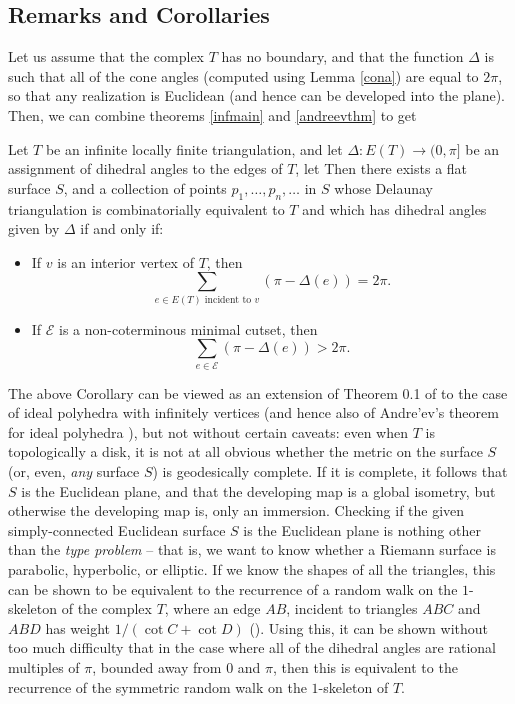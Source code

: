 \documentclass{acmart}
\newcommand{\thm}[2]{\begin{#1} #2 \end{#1}}
\begin{document}
\subsection{Remarks and Corollaries}

Let us assume that the complex $T$ has no boundary, and that the
function $\Delta$ is such that all of the cone angles (computed using
Lemma \ref{cona}) are equal to $2\pi$, so that any realization is
Euclidean (and hence can be developed into the plane). Then, we can
combine theorems \ref{infmain} and \ref{andreevthm} to get 

\thm{corollary}
{
\label{infandreev}
Let $T$ be an infinite locally finite triangulation, and let $\Delta:
E(T) \rightarrow (0, \pi]$ be an assignment of dihedral angles to the
edges of $T$, let Then there exists a flat surface $S$, and a
collection of points $p_1, \ldots, p_n, \ldots$ in $S$ whose Delaunay
triangulation is combinatorially equivalent to $T$ and which has dihedral
angles given by $\Delta$ if and only if:

\begin{itemize}

\item\label{sumvv1} If $v$ is an interior vertex of $T$, then
\begin{equation}
\sum_{\mbox{$e \in E(T)$ incident to $v$}} (\pi - \Delta(e)) = 2\pi.
\end{equation}

\item\label{sumintcyc1} If $\mathcal{E}$ is a non-coterminous minimal
  cutset, then
\begin{equation}
\sum_{e \in \mathcal{E}} (\pi - \Delta(e)) > 2\pi.
\end{equation}

\end{itemize}
}

The above Corollary can be viewed as an extension of Theorem 0.1 of
\cite{steiner} to the case of ideal polyhedra with infinitely vertices
(and hence also of Andre'ev's theorem for ideal polyhedra \cite{Andr70b}),
but not without certain caveats: even when $T$ is topologically a
disk, it is not at all obvious whether the metric on the surface $S$
(or, even, {\em any} surface $S$) is geodesically complete. If it is complete,
it follows that $S$ is the Euclidean plane, and that the developing
map is a global isometry, but otherwise the developing map is,
only an immersion. Checking if the given simply-connected Euclidean
surface $S$ is the Euclidean plane is nothing other than the
\emph{type problem} -- that is, we want to know whether a Riemann surface
is parabolic, hyperbolic, or elliptic. If we know the shapes of all
the triangles, this can be shown to be equivalent to the recurrence of
a random walk on the $1$-skeleton of the complex $T$, where an edge
$AB$, incident to triangles $ABC$ and $ABD$ has weight $1/(\cot C +
\cot D)$ (\cite{irivp}). Using this, it can be shown without too much
difficulty that in the case where all of the dihedral angles are
rational multiples of $\pi$, bounded away from $0$ and $\pi$, then
this is equivalent to the recurrence of the symmetric random walk on
the $1$-skeleton of $T$.  
\end{document}
